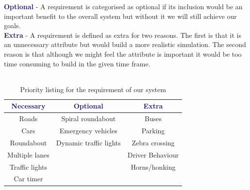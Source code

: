 \documentclass{article}
\begin{document}
\noindent
\textcolor{MidnightBlue}{\bf Optional} - A requirement is categorised as optional if its inclusion would be an important benefit to the overall system but without it we will still achieve our goals.\\

\noindent
\textcolor{MidnightBlue}{\bf Extra} - A requirement is defined as extra for two reasons. 
The first is that it is an unnecessary attribute but would build a more realistic simulation. 
The second reason is that although we might feel the attribute is important it would be too time consuming to build in the given time frame.\\\\




\begin{table}[H] 
	\centering
	\label{PriorityListing}
	\begin{tabular}{|c|c|c|}
		\hline \rule{0pt}{2.5ex}
		\textcolor{MidnightBlue}{\bf Necessary}      & \textcolor{MidnightBlue}{\bf Optional} & \textcolor{MidnightBlue}{\bf Extra}   \\ \hline \rule{0pt}{2.5ex}
		Roads & Spiral roundabout & Buses  \\ 
		Cars & Emergency vehicles & Parking \\ 
		Roundabout & Dynamic traffic lights & Zebra crossing \\ 
		Multiple lanes & & Driver Behaviour  \\
		Traffic lights & & Horns/honking \\
		Car timer  & & \\ \hline 
	\end{tabular}
	\caption{Priority listing for the requirement of our system}
	\label{requirements}
	
\end{table}
\end{document}
